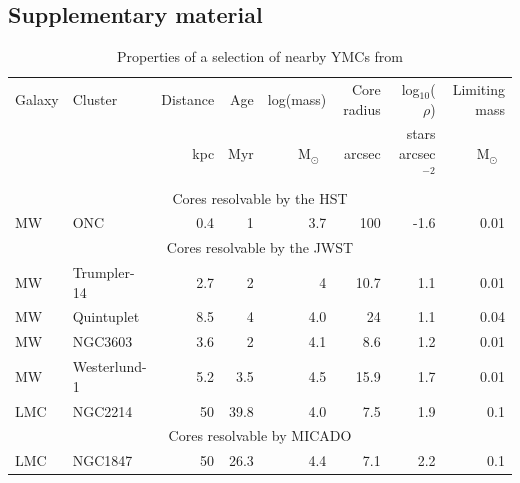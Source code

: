 \documentclass[referee]{aa}
\newcommand{\msun}{M$_\odot$~}
\newcommand{\h}[1]{$^{#1}$}
\begin{document}
\begin{appendix}

\section{Supplementary material}
\label{sec:appendix}

\begin{table}
    \centering
    \caption{Properties of a selection of nearby YMCs from \citet{portegies2010}}
    \label{tbl:pz10_selection}
    \begin{tabular}{l l r r r r r r}
        \hline\hline
        Galaxy & Cluster      & Distance & Age  & log(mass) & Core radius & log$_{10}$($\rho$)    & Limiting mass \\
              &              & kpc      & Myr  & \msun     & arcsec  & stars arcsec\h{-2} & \msun         \\
        \hline
        \multicolumn{8}{c}{Cores resolvable by the HST}                                                     \\
        \hline
        MW     & ONC          & 0.4      & 1    & 3.7       & 100     & -1.6           & 0.01          \\
        \hline
        \multicolumn{8}{c}{Cores resolvable by the JWST}                                                    \\
        \hline
        MW     & Trumpler-14  & 2.7      & 2    & 4         & 10.7    & 1.1            & 0.01          \\
        MW     & Quintuplet   & 8.5      & 4    & 4.0       & 24      & 1.1            & 0.04          \\
        MW     & NGC3603      & 3.6      & 2    & 4.1       & 8.6     & 1.2            & 0.01          \\
        MW     & Westerlund-1 & 5.2      & 3.5  & 4.5       & 15.9    & 1.7            & 0.01          \\
        LMC    & NGC2214      & 50       & 39.8 & 4.0       & 7.5     & 1.9            & 0.1           \\
        \hline
        \multicolumn{8}{c}{Cores resolvable by MICADO}                                                  \\
        \hline
        LMC    & NGC1847      & 50       & 26.3 & 4.4       & 7.1     & 2.2            & 0.1           \\

\end{tabular}
\end{table}
\end{appendix}
\end{document}

